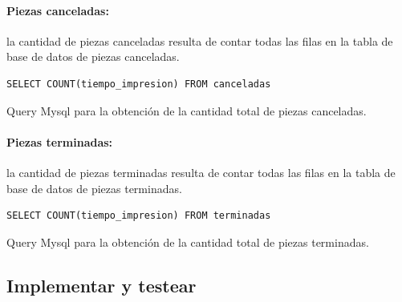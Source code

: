 \paragraph{Piezas canceladas:} la cantidad de piezas canceladas resulta de contar todas las filas en la tabla de base de datos de piezas canceladas.

\begin{table}[H]
\begin{lstlisting}
SELECT COUNT(tiempo_impresion) FROM canceladas
\end{lstlisting}
\caption{Query Mysql para la obtención de la cantidad  total de piezas canceladas.}
\end{table}

\paragraph{Piezas terminadas:} la cantidad de piezas terminadas resulta de contar todas las filas en la tabla de base de datos de piezas terminadas.


\begin{table}[H]
\begin{lstlisting}
SELECT COUNT(tiempo_impresion) FROM terminadas
\end{lstlisting}
\caption{Query Mysql para la obtención de la cantidad  total de piezas terminadas.}
\end{table}

\subsection{Implementar y testear}

